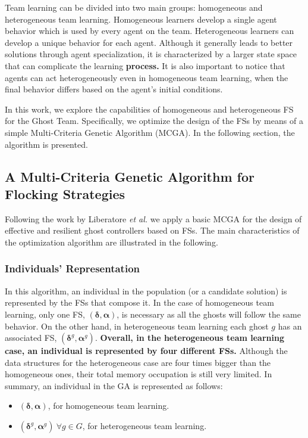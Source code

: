 \documentclass[journal]{IEEEtran}
\begin{document}
Team learning can be divided into two main groups: homogeneous and
heterogeneous team learning. Homogeneous learners develop a single
agent behavior which is used by every agent on the team. Heterogeneous
learners can develop a unique behavior for each agent. Although it
generally leads to better solutions through agent specialization, it
is characterized by a larger state space that can complicate the learning \textbf{process.} It is also
 important to notice that agents can act heterogeneously even in
 homogeneous team learning, when the final behavior differs based on
 the agent's initial conditions. 

In this work, we explore the capabilities of homogeneous and heterogeneous FS for the Ghost Team. Specifically, we optimize the design of the FSs by means of a simple Multi-Criteria Genetic Algorithm (MCGA). In the following section, the algorithm is presented.

\subsection{A Multi-Criteria Genetic Algorithm for Flocking Strategies}
Following the work by Liberatore \emph{et al.} \cite{Liberatore2014} we apply a basic MCGA for the design of effective and resilient ghost controllers based on FSs. The main characteristics of the optimization algorithm are illustrated in the following.

\subsubsection{Individuals' Representation}
In this algorithm, an individual in the population (or a candidate solution) is represented by the FSs that compose it. In the case of homogeneous team learning, only one FS, $(\boldsymbol\delta, \boldsymbol\alpha)$, is necessary as all the ghosts will follow the same behavior. On the other hand, in heterogeneous team learning each ghost $g$ has an associated FS, $(\boldsymbol\delta^g,  \boldsymbol\alpha^g)$. \textbf{Overall, in the heterogeneous team learning case, an individual is represented by four different FSs.} Although the data structures for the heterogeneous case are four times bigger than the homogeneous ones, their total memory occupation is still very limited. In summary, an individual in the GA is represented as follows:

\begin{itemize}
  \item $(\boldsymbol\delta, \boldsymbol\alpha)$, for homogeneous team learning.
  \item $(\boldsymbol\delta^g, \boldsymbol\alpha^g)\: \forall g \in G$, for heterogeneous team learning.
\end{itemize}
\end{document}
